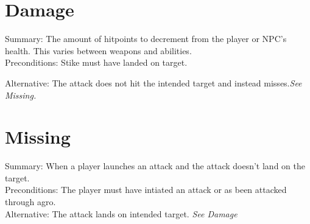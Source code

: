 \documentclass{report}
\begin{document}
    \section{Damage}
    Summary: The amount of hitpoints to decrement from the player or NPC's health. This varies between weapons and abilities.\\
    
    Preconditions: Stike must have landed on target.
    
    Alternative: The attack does not hit the intended target and instead misses.\textit{See Missing.}
    
    \section{Missing}
    Summary: When a player launches an attack and the attack doesn't land on the target.\\
    
    Preconditions: The player must have intiated an attack or as been attacked through agro.\\
    Alternative: The attack lands on intended target. \textit{See Damage}
\end{document}

